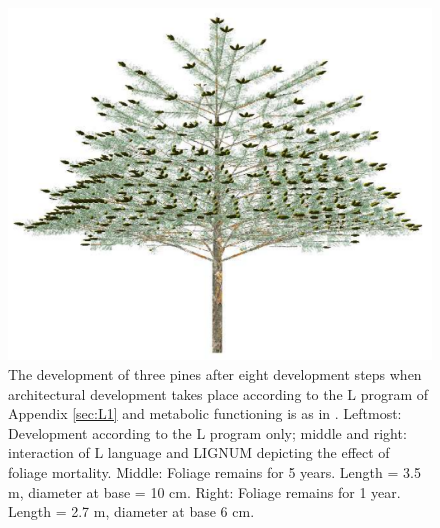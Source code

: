\begin{figure}
\includegraphics[scale=0.20]{pine8F1}   \caption{The   development  of
  three  pines  after   eight  development  steps  when  architectural
  development  takes place  according  to the  L  program of  Appendix
  \ref{sec:L1} and metabolic functioning is as in \citet{perttunen:96,
    perttunen:98}.  Leftmost:  Development according to  the L program
  only;  middle  and  right:  interaction  of L  language  and  LIGNUM
  depicting the effect of  foliage mortality.  Middle: Foliage remains
  for 5  years.  Length  = 3.5 m,  diameter at  base = 10  cm.  Right:
  Foliage remains for 1 year.  Length = 2.7 m, diameter at base 6 cm.}
\label{fig:pine} \end{figure}


